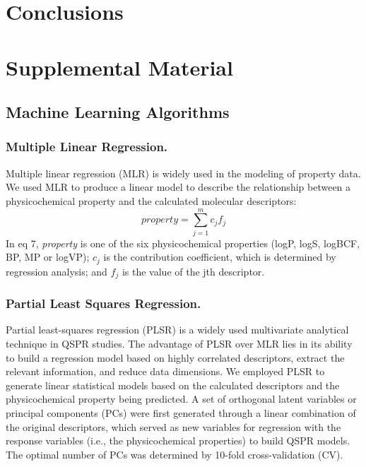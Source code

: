 \documentclass[10pt, letter]{article}
\renewcommand{\=}{\, =\, }
\newcommand{\+}{\, +\, }
\renewcommand{\-}{\, -\, }
\begin{document}
\section{Conclusions}

\section{Supplemental Material}

\subsection{Machine Learning Algorithms}

\subsubsection{Multiple Linear Regression.} Multiple linear regression
(MLR) is widely used in the modeling of property data. We
used MLR to produce a linear model to describe the
relationship between a physicochemical property and the calculated
molecular descriptors:
\begin{equation}
property = \sum_{j = 1}^{m}c_{j}f_{j}
\end{equation}
In eq 7, \textit{property} is one of the six physicochemical properties
(logP, logS, logBCF, BP, MP or logVP); \(c_{j}\) is the contribution
coefficient, which is determined by regression analysis; and \(f_{j}\) is
the value of the jth descriptor. 

\subsubsection{Partial Least Squares Regression.} Partial least-squares
regression (PLSR) is a widely used multivariate analytical
technique in QSPR studies. The advantage of PLSR over
MLR lies in its ability to build a regression model based on
highly correlated descriptors, extract the relevant information,
and reduce data dimensions. We employed PLSR to generate
linear statistical models based on the calculated descriptors and the
physicochemical property being predicted. A set of orthogonal
latent variables or principal components (PCs) were first
generated through a linear combination of the original
descriptors, which served as new variables for
regression with the response variables (i.e., the physicochemical
properties) to build QSPR models. The optimal number of PCs
was determined by 10-fold cross-validation (CV).
\end{document}

